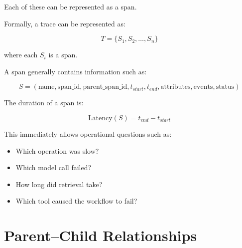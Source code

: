 \documentclass[11pt,a4paper]{article}
\begin{document}
Each of these can be represented as a span.

\begin{center}
\end{center}

Formally, a trace can be represented as:

\[
T = \{S_1, S_2, \ldots, S_n\}
\]

where each $S_i$ is a span.

A span generally contains information such as:

\[
S =
(
\text{name},
\text{span\_id},
\text{parent\_span\_id},
t_{start},
t_{end},
\text{attributes},
\text{events},
\text{status}
)
\]

The duration of a span is:

\[
\text{Latency}(S) = t_{end} - t_{start}
\]

This immediately allows operational questions such as:

\begin{itemize}
\item Which operation was slow?
\item Which model call failed?
\item How long did retrieval take?
\item Which tool caused the workflow to fail?
\end{itemize}

\section{Parent--Child Relationships}
\end{document}
